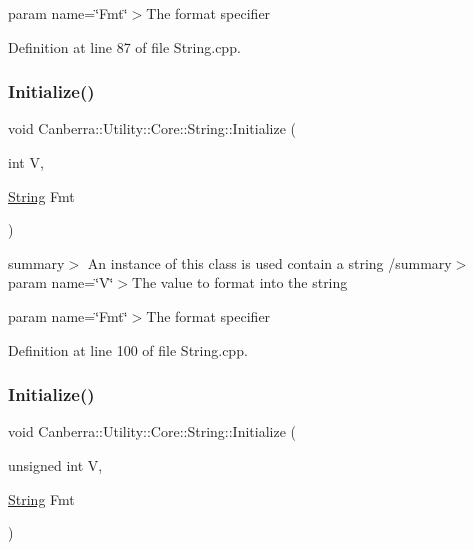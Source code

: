 param name=\char`\"{}\+Fmt\char`\"{}$>$The format specifier

Definition at line 87 of file String.\+cpp.

\mbox{\label{class_canberra_1_1_utility_1_1_core_1_1_string_a207f877beda1ccde8f84a78273e086e0_a207f877beda1ccde8f84a78273e086e0}} 
\subsubsection{\texorpdfstring{Initialize()}{Initialize()}\hspace{0.1cm}{\footnotesize\ttfamily [3/8]}}
{\footnotesize\ttfamily void Canberra\+::\+Utility\+::\+Core\+::\+String\+::\+Initialize (\begin{DoxyParamCaption}\item[{int}]{V,  }\item[{\hyperlink{class_canberra_1_1_utility_1_1_core_1_1_string}{String}}]{Fmt }\end{DoxyParamCaption})\hspace{0.3cm}{\ttfamily [protected]}}

summary$>$ An instance of this class is used contain a string /summary$>$ param name=\char`\"{}\+V\char`\"{}$>$The value to format into the string

param name=\char`\"{}\+Fmt\char`\"{}$>$The format specifier

Definition at line 100 of file String.\+cpp.

\mbox{\label{class_canberra_1_1_utility_1_1_core_1_1_string_ae24ba15e3ce5ca204bad161905a96fff_ae24ba15e3ce5ca204bad161905a96fff}} 
\subsubsection{\texorpdfstring{Initialize()}{Initialize()}\hspace{0.1cm}{\footnotesize\ttfamily [4/8]}}
{\footnotesize\ttfamily void Canberra\+::\+Utility\+::\+Core\+::\+String\+::\+Initialize (\begin{DoxyParamCaption}\item[{unsigned int}]{V,  }\item[{\hyperlink{class_canberra_1_1_utility_1_1_core_1_1_string}{String}}]{Fmt }\end{DoxyParamCaption})\hspace{0.3cm}{\ttfamily [protected]}}

